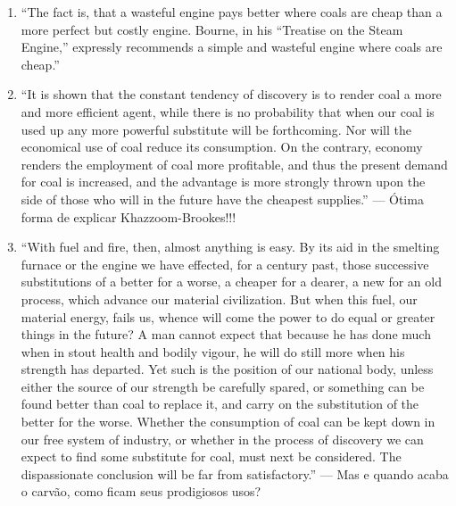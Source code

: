\documentclass[12pt]{article}
\begin{document}
\begin{enumerate}
    \item ``The fact is, that a wasteful engine pays better where coals are cheap than a more perfect but costly engine. Bourne, in his ``Treatise on the Steam Engine,'' expressly recommends a simple and wasteful engine where coals are cheap.'' \cite[p. 6 (prefácio à segunda edição)]{Jevons1866}
    \item ``It is shown that the constant tendency of discovery is to render coal a more and more efficient agent, while there is no probability that when our coal is used up any more powerful substitute will be forthcoming. Nor will the economical use of coal reduce its consumption. On the contrary, economy renders the employment of coal more profitable, and thus the present demand for coal is increased, and the advantage is more strongly thrown upon the side of those who will in the future have the cheapest supplies.'' \cite[p. 17]{Jevons1866}  --- Ótima forma de explicar Khazzoom-Brookes!!!
    \item “With fuel and fire, then, almost anything is easy. By its aid in the smelting furnace or the engine we have effected, for a century past, those successive substitutions of a better for a worse, a cheaper for a dearer, a new for an old process, which advance our material civilization. But when this fuel, our material energy, fails us, whence will come the power to do equal or greater things in the future? A man cannot expect that because he has done much when in stout health and bodily vigour, he will do still more when his strength has departed. Yet such is the position of our national body, unless either the source of our strength be carefully spared, or something can be found better than coal to replace it, and carry on the substitution of the better for the worse. Whether the consumption of coal can be kept down in our free system of industry, or whether in the process of discovery we can expect to find some substitute for coal, must next be considered. The dispassionate conclusion will be far from satisfactory.” \cite[p. 72]{Jevons1866} --- Mas e quando acaba o carvão, como ficam seus prodigiosos usos?
\end{enumerate}
\end{document}
